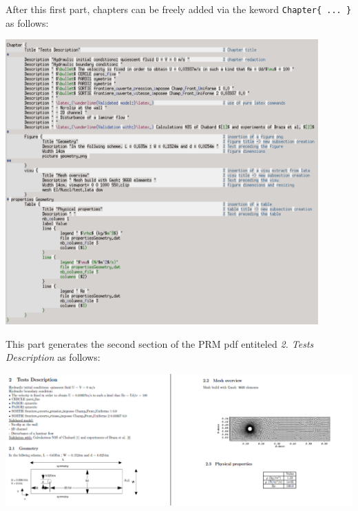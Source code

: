 After this first part, chapters can be freely added via the keword \verb"Chapter{ ... }" as follows:\newline
\begin{center}\includegraphics[width=12cm]{tools/chapter_PRM_1.png}\end{center}
\begin{center}\end{center}

This part generates the second section of the PRM pdf entiteled \textit{2. Tests Description} as follows:\newline
\begin{center}\includegraphics[width=15cm]{tools/chapter_PRM_1_pdf.png}\end{center}
\begin{center}\end{center}

